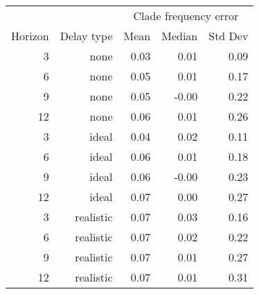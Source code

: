 
\begin{tabular*}{0.7\textwidth}{rrrrr}
\toprule
        &            & \multicolumn{3}{c}{Clade frequency error} \\
Horizon & Delay type & Mean & Median & Std Dev \\
\midrule

3 & none & 0.03 & 0.01 & 0.09 \\
6 & none & 0.05 & 0.01 & 0.17 \\
9 & none & 0.05 & -0.00 & 0.22 \\
12 & none & 0.06 & 0.01 & 0.26 \\
3 & ideal & 0.04 & 0.02 & 0.11 \\
6 & ideal & 0.06 & 0.01 & 0.18 \\
9 & ideal & 0.06 & -0.00 & 0.23 \\
12 & ideal & 0.07 & 0.00 & 0.27 \\
3 & realistic & 0.07 & 0.03 & 0.16 \\
6 & realistic & 0.07 & 0.02 & 0.22 \\
9 & realistic & 0.07 & 0.01 & 0.27 \\
12 & realistic & 0.07 & 0.01 & 0.31 \\

\bottomrule
\end{tabular*}

